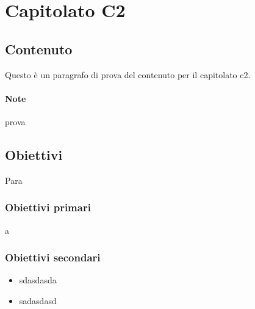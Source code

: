 \section{Capitolato C2}
\subsection{Contenuto}
Questo è un paragrafo di prova del contenuto per il capitolato c2.
\paragraph{Note}
prova
\subsection{Obiettivi}
Para
\subsubsection{Obiettivi primari}
a
\subsubsection{Obiettivi secondari}
\begin{itemize}
	\item sdasdasda
	\item sadasdasd
\end{itemize}